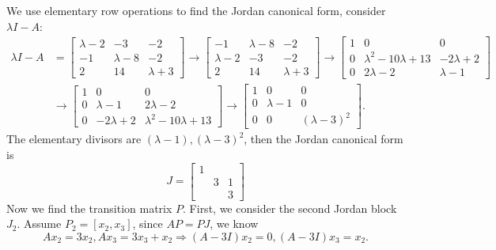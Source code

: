 \begin{solution}
  We use elementary row operations to find the Jordan canonical form,
  consider $\lambda I - A$:
  \begin{align}
    \lambda I - A &=
    \begin{bmatrix}
      \lambda - 2 & -3 & -2\\
      -1 & \lambda - 8 & -2\\
      2 & 14 & \lambda + 3
    \end{bmatrix}
    \rightarrow
    \begin{bmatrix}
      -1 & \lambda - 8 & -2\\
      \lambda - 2 & -3 & -2\\
      2 & 14 & \lambda + 3
    \end{bmatrix}
    \rightarrow
    \begin{bmatrix}
      1 & 0 & 0\\
      0 & \lambda^2 - 10\lambda + 13 & -2\lambda + 2\\
      0 & 2\lambda - 2 & \lambda-1
    \end{bmatrix}\\
    &\rightarrow
    \begin{bmatrix}
      1 & 0 & 0\\
      0 & \lambda-1 & 2\lambda-2\\
      0 & -2\lambda+2 & \lambda^2-10\lambda + 13
    \end{bmatrix}
      \rightarrow 
    \begin{bmatrix}
      1 & 0 & 0\\
      0 & \lambda-1 & 0\\
      0 & 0 & (\lambda-3)^2
    \end{bmatrix}.
  \end{align}
  The elementary divisors are $(\lambda-1), (\lambda-3)^2$, then the
  Jordan canonical form is
  \begin{equation}
    J =
    \begin{bmatrix}
      1 & & \\
        & 3 & 1\\
        & & 3
    \end{bmatrix}
  \end{equation}
  Now we find the transition matrix $P$. First, we consider the second Jordan
  block $J_2$. Assume $P_2 = [x_2, x_3]$, since $AP = PJ$, we know
  \begin{equation}
    Ax_2 = 3x_2, Ax_3 = 3x_3 + x_2
    \Rightarrow (A - 3I)x_2 = 0, (A - 3I)x_3 = x_2.
  \end{equation}

\end{solution}
